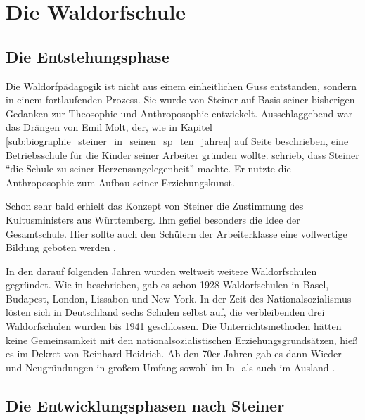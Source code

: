 \section{Die Waldorfschule}

\subsection{Die Entstehungsphase} %
\label{sub:die_entstehungsphase}

Die Waldorfpädagogik ist nicht aus einem einheitlichen Guss entstanden, sondern in einem fortlaufenden Prozess. Sie wurde von Steiner auf Basis seiner bisherigen Gedanken zur Theosophie und Anthroposophie entwickelt. Ausschlaggebend war das Drängen von Emil Molt, der, wie in Kapitel \ref{sub:biographie_steiner_in_seinen_sp_ten_jahren} auf Seite \pageref{sub:biographie_steiner_in_seinen_sp_ten_jahren} beschrieben, eine Betriebsschule für die Kinder seiner Arbeiter gründen wollte. \citet[S. 125]{hemleben63} schrieb, dass Steiner \enquote{die Schule zu seiner Herzensangelegenheit} machte. Er nutzte die Anthroposophie zum Aufbau seiner Erziehungskunst.

Schon sehr bald erhielt das Konzept von Steiner die Zustimmung des Kultusministers aus Württemberg. Ihm gefiel besonders die Idee der Gesamtschule. Hier sollte auch den Schülern der Arbeiterklasse eine vollwertige Bildung geboten werden \citep[vgl.][S. 279]{frielingsdorf12}. 

In den darauf folgenden Jahren wurden weltweit weitere Waldorfschulen gegründet. Wie in \citet{wikipedia2} beschrieben, gab es schon 1928 Waldorfschulen in Basel, Budapest, London, Lissabon und New York. In der Zeit des Nationalsozialismus lösten sich in Deutschland sechs Schulen selbst auf, die verbleibenden drei Waldorfschulen wurden bis 1941 geschlossen. Die Unterrichtsmethoden hätten  keine Gemeinsamkeit mit den nationalsozialistischen Erziehungsgrundsätzen, hieß es im Dekret von Reinhard Heidrich. Ab den 70er Jahren gab es dann Wieder- und Neugründungen in großem Umfang sowohl im In- als auch im Ausland \citep[vgl.][]{wikipedia2}. 


\subsection{Die Entwicklungsphasen nach Steiner} %
\label{sub:Ziele, Besonderheiten, Rolle von Lehrern und Schülern}

